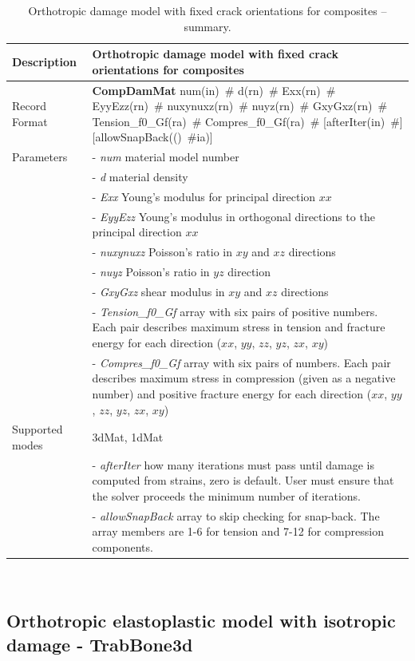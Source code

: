 \documentclass[a4paper]{article}
\newcommand{\descitem}[1]{{\noindent \bf #1}}
\newcommand{\elemparam}[2]{{{#1\tiny (#2)}~\#}}
\newcommand{\param}[1]{{\it #1}}
\newenvironment{mmt}{\begin{tabular}{|l|p{9cm}|}}{\end{tabular}\\}
\newenvironment{mmt}{\begin{tabular}{|l|l|}}{\end{tabular}\\}
\begin{document}
\begin{table}[!htb]
\begin{mmt}
\hline
Description & Orthotropic damage model with fixed crack orientations for composites\\
\hline
Record Format & \descitem{CompDamMat}  \elemparam{num}{in}
\elemparam{d}{rn} \elemparam{Exx}{rn} \elemparam{EyyEzz}{rn}
\elemparam{nuxynuxz}{rn} \elemparam{nuyz}{rn} \elemparam{GxyGxz}{rn}
\elemparam{Tension\_f0\_Gf}{ra} \elemparam{Compres\_f0\_Gf}{ra} [\elemparam{afterIter}{in}] [\elemparam{allowSnapBack}(ia)]\\
Parameters
&- \param{num} material model number\\
&- \param{d} material density\\
&- \param{Exx} Young's modulus for principal direction $xx$\\
&- \param{EyyEzz} Young's modulus in orthogonal directions to the principal direction $xx$\\
&- \param{nuxynuxz} Poisson's ratio in $xy$ and $xz$ directions\\
&- \param{nuyz} Poisson's ratio in $yz$ direction\\
&- \param{GxyGxz} shear modulus in $xy$ and $xz$ directions\\
&- \param{Tension\_f0\_Gf} array with six pairs of positive numbers. Each pair describes maximum stress in tension and fracture energy for each direction ($xx$, $yy$, $zz$, $yz$, $zx$, $xy$)\\
&- \param{Compres\_f0\_Gf} array with six pairs of numbers. Each pair describes maximum stress in compression (given as a negative number) and positive fracture energy for each direction ($xx$, $yy$, $zz$, $yz$, $zx$, $xy$)\\
Supported modes& 3dMat, 1dMat\\
&- \param {afterIter} how many iterations must pass until damage is computed from strains, zero is default. User must ensure that the solver proceeds the minimum number of iterations.\\
&- \param {allowSnapBack} array to skip checking for snap-back. The array members are 1-6 for tension and 7-12 for compression components.\\
\hline
\end{mmt}
\caption{Orthotropic damage model with fixed crack orientations for composites -- summary.}
\label{compdammat_table}
\end{table}



\subsection{Orthotropic elastoplastic model with isotropic damage - TrabBone3d}
\end{document}
